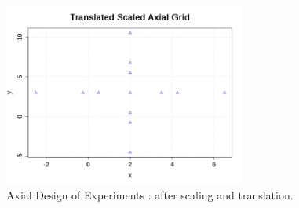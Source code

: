              \begin{figure}[H]
               \begin{center}
                 \includegraphics[width=8cm]{Figures/TranslatedScaledAxialGrid.png}
               \end{center}
               \caption{Axial Design of Experiments  : after scaling and translation.}
               \label{TranslatedScaledAxialGrid}
             \end{figure}



